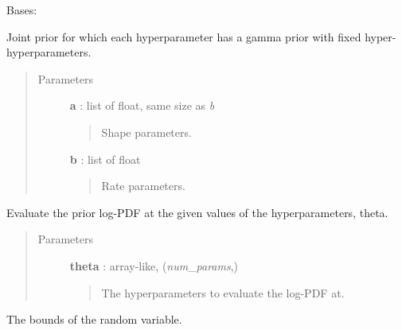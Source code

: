 \documentclass[letterpaper,10pt,english]{sphinxmanual}
\begin{document}
\begin{fulllineitems}
\label{gptools:gptools.utils.GammaJointPrior}
Bases: {\hyperref[gptools:gptools.utils.JointPrior]{}}

Joint prior for which each hyperparameter has a gamma prior with fixed hyper-hyperparameters.
\begin{quote}\begin{description}
\item[{Parameters}] \leavevmode
\textbf{a} : list of float, same size as \emph{b}
\begin{quote}

Shape parameters.
\end{quote}

\textbf{b} : list of float
\begin{quote}

Rate parameters.
\end{quote}

\end{description}\end{quote}

\begin{fulllineitems}
\label{gptools:gptools.utils.GammaJointPrior.__call__}
Evaluate the prior log-PDF at the given values of the hyperparameters, theta.
\begin{quote}\begin{description}
\item[{Parameters}] \leavevmode
\textbf{theta} : array-like, (\emph{num\_params},)
\begin{quote}

The hyperparameters to evaluate the log-PDF at.
\end{quote}

\end{description}\end{quote}

\end{fulllineitems}


\begin{fulllineitems}
\label{gptools:gptools.utils.GammaJointPrior.bounds}
The bounds of the random variable.


\end{fulllineitems}
\end{fulllineitems}
\end{document}
